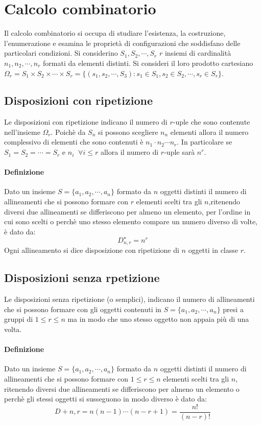 \chapter{Calcolo combinatorio}
Il calcolo combinatorio si occupa di studiare l’esistenza, la costruzione, l’enumerazione e esamina le proprietà di configurazioni che soddisfano delle 
particolari condizioni. Si considerino $S_1, S_2,\cdots, S_r$ $r$ insiemi di cardinalit\`a $n_1, n_2,\cdots,n_r$ formati da elementi distinti. Si consideri il 
loro prodotto cartesiano $\Omega_r=S_1\times S_2\times\cdots\times S_r=\{(s_1,s_2,\cdots, S_3):s_1\in S_1,s_2\in S_2,\cdots,s_r\in S_r\}$. 
\section{Disposizioni con ripetizione}
Le disposizioni con ripetizione indicano il numero di $r$-uple che sono contenute nell'insieme $\Omega_r$. Poich\`e da $S_n$ si possono scegliere $n_n$ elementi
allora il numero complessivo di elementi che sono contenuti \`e $n_1\cdot n_2\cdots n_r$. In particolare se $S_1=S_2=\cdots=S_r$ e $n_i\;\;\forall i\le r$ 
allora il numero di $r$-uple sar\`a $n^r$.
\subsubsection{Definizione}
Dato un insieme $S=\{a_1,a_2,\cdots, a_n\}$ formato da $n$ oggetti distinti il numero di allineamenti che si possono formare con $r$ elementi scelti tra gli $n
$,ritenendo diversi due allineamenti se differiscono per almeno un elemento, per l'ordine in cui sono scelti o perch\`e uno stesso elemento compare un numero 
diverso di volte, \`e dato da:
\begin{equation}
D^\star_{n,r}=n^r
\end{equation}
Ogni allineamento si dice disposizione con ripetizione di $n$ oggetti in classe $r$.
\section{Disposizioni senza rpetizione}
Le disposizioni senza ripetizione (o semplici), indicano il numero di allineamenti che si possono formare con gli oggetti contenuti in $S=\{a_1,a_2,\cdots, a_n
\}$ presi a gruppi di $1\le r\le n$ ma in modo che uno stesso oggetto non appaia pi\`u di una volta.
\subsubsection{Definizione}
Dato un insieme $S=\{a_1,a_2,\cdots, a_n\}$ formato da $n$ oggetti distinti il numero di allineamenti che si possono formare con $1\le r\le n$ elementi scelti
tra gli $n$, ritenendo diversi due allineamenti se differiscono per almeno un elemento o perch\`e gli stessi oggetti si susseguono in modo diverso \`e dato da:
\begin{equation}
D+{n,r}=n(n-1)\cdots(n-r+1)=\dfrac{n!}{(n-r)!}
\end{equation}
